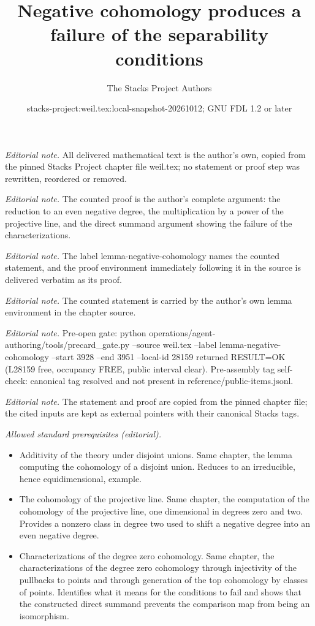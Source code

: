 \documentclass[10pt,a4paper]{amsart}
\title{Negative cohomology produces a failure of the separability conditions}
\author{The Stacks Project Authors}
\date{stacks-project:weil.tex:local-snapshot-20261012; GNU FDL 1.2 or later}
\theoremstyle{plain}
\theoremstyle{definition}
\theoremstyle{remark}
\numberwithin{equation}{subsection}
\begin{document}
\maketitle
\noindent\textit{Editorial note.} All delivered mathematical text is the author's own, copied from the pinned Stacks Project chapter file weil.tex; no statement or proof step was rewritten, reordered or removed.\par\medskip
\noindent\textit{Editorial note.} The counted proof is the author's complete argument: the reduction to an even negative degree, the multiplication by a power of the projective line, and the direct summand argument showing the failure of the characterizations.\par\medskip
\noindent\textit{Editorial note.} The label lemma-negative-cohomology names the counted statement, and the proof environment immediately following it in the source is delivered verbatim as its proof.\par\medskip
\noindent\textit{Editorial note.} The counted statement is carried by the author's own lemma environment in the chapter source.\par\medskip
\noindent\textit{Editorial note.} Pre-open gate: python operations/agent-authoring/tools/precard\_gate.py --source weil.tex --label lemma-negative-cohomology --start 3928 --end 3951 --local-id 28159 returned RESULT=OK (L28159 free, occupancy FREE, public interval clear). Pre-assembly tag self-check: canonical tag resolved and not present in reference/public-items.jsonl.\par\medskip
\noindent\textit{Editorial note.} The statement and proof are copied from the pinned chapter file; the cited inputs are kept as external pointers with their canonical Stacks tags.\par\medskip
\noindent\textit{Allowed standard prerequisites (editorial).}\begin{itemize}
\item Additivity of the theory under disjoint unions. Same chapter, the lemma computing the cohomology of a disjoint union. Reduces to an irreducible, hence equidimensional, example.
\item The cohomology of the projective line. Same chapter, the computation of the cohomology of the projective line, one dimensional in degrees zero and two. Provides a nonzero class in degree two used to shift a negative degree into an even negative degree.
\item Characterizations of the degree zero cohomology. Same chapter, the characterizations of the degree zero cohomology through injectivity of the pullbacks to points and through generation of the top cohomology by classes of points. Identifies what it means for the conditions to fail and shows that the constructed direct summand prevents the comparison map from being an isomorphism.
\end{itemize}\medskip
\end{document}
